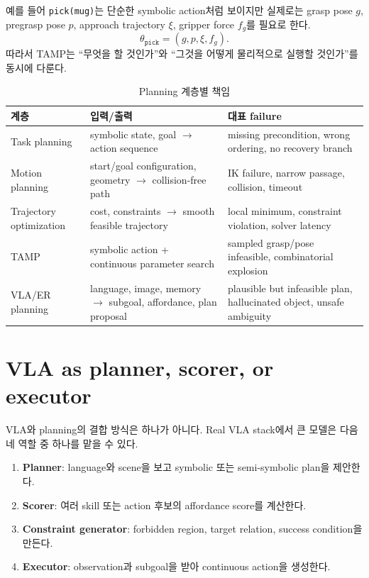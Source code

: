 예를 들어 \texttt{pick(mug)}는 단순한 symbolic action처럼 보이지만 실제로는 grasp pose $g$, pregrasp pose $p$, approach trajectory $\xi$, gripper force $f_g$를 필요로 한다.
\begin{equation}
  \theta_{\texttt{pick}}
  =
  (g,p,\xi,f_g).
  \label{eq:pick-continuous-params}
\end{equation}
따라서 TAMP는 ``무엇을 할 것인가''와 ``그것을 어떻게 물리적으로 실행할 것인가''를 동시에 다룬다.

\begin{table}[ht]
\centering
\caption{Planning 계층별 책임}
\label{tab:planning-layers}
\small
\begin{tabularx}{\textwidth}{p{30mm}X X}
\toprule
계층 & 입력/출력 & 대표 failure \\
\midrule
Task planning & symbolic state, goal $\rightarrow$ action sequence & missing precondition, wrong ordering, no recovery branch \\
Motion planning & start/goal configuration, geometry $\rightarrow$ collision-free path & IK failure, narrow passage, collision, timeout \\
Trajectory optimization & cost, constraints $\rightarrow$ smooth feasible trajectory & local minimum, constraint violation, solver latency \\
TAMP & symbolic action + continuous parameter search & sampled grasp/pose infeasible, combinatorial explosion \\
VLA/ER planning & language, image, memory $\rightarrow$ subgoal, affordance, plan proposal & plausible but infeasible plan, hallucinated object, unsafe ambiguity \\
\bottomrule
\end{tabularx}
\end{table}

\section{VLA as planner, scorer, or executor}

VLA와 planning의 결합 방식은 하나가 아니다. Real VLA stack에서 큰 모델은 다음 네 역할 중 하나를 맡을 수 있다.

\begin{enumerate}
  \item \textbf{Planner}: language와 scene을 보고 symbolic 또는 semi-symbolic plan을 제안한다.
  \item \textbf{Scorer}: 여러 skill 또는 action 후보의 affordance score를 계산한다.
  \item \textbf{Constraint generator}: forbidden region, target relation, success condition을 만든다.
  \item \textbf{Executor}: observation과 subgoal을 받아 continuous action을 생성한다.
\end{enumerate}

